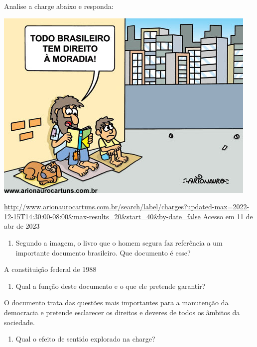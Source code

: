 Analise a charge abaixo e responda:

\includegraphics[width=5in,height=3.65625in]{./imgSAEB_7_POR/media/image5.png}

\href{http://www.arionaurocartuns.com.br/search/label/charges?updated-max=2022-12-15T14:30:00-08:00\&max-results=20\&start=40\&by-date=false}{\uline{http://www.arionaurocartuns.com.br/search/label/charges?updated-max=2022-12-15T14:30:00-08:00\&max-results=20\&start=40\&by-date=false}}
Acesso em 11 de abr de 2023

\begin{enumerate}
\def\labelenumi{\arabic{enumi})}
\setcounter{enumi}{6}
\tightlist
\item
  Segundo a imagem, o livro que o homem segura faz referência a um
  importante documento brasileiro. Que documento é esse?
\end{enumerate}

A constituição federal de 1988

\begin{enumerate}
\def\labelenumi{\arabic{enumi})}
\setcounter{enumi}{7}
\tightlist
\item
  Qual a função deste documento e o que ele pretende garantir?
\end{enumerate}

O documento trata das questões mais importantes para a manutenção da
democracia e pretende esclarecer os direitos e deveres de todos os
âmbitos da sociedade.

\begin{enumerate}
\def\labelenumi{\arabic{enumi})}
\setcounter{enumi}{8}
\tightlist
\item
  Qual o efeito de sentido explorado na charge?
\end{enumerate}

